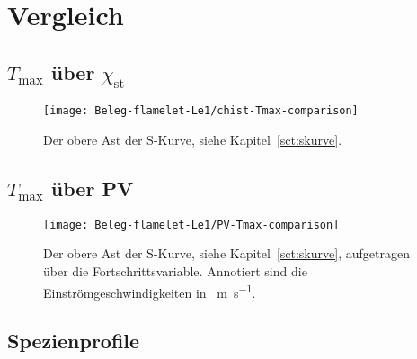 
\section{Vergleich}

\subsection{\texorpdfstring{$T_\mathrm{max}$}{Tmax} über \texorpdfstring{$\chi_\mathrm{st}$}{chist}}
\label{sct:cmp-Tmax-chist}

\begin{figure}[H]
    \begin{center}\begin{minipage}{0.7\linewidth}
        \texttt{[image: Beleg-flamelet-Le1/chist-Tmax-comparison]}
    \end{minipage}\end{center}
    \caption{Der obere Ast der S-Kurve, siehe Kapitel~\ref{sct:skurve}.}
\end{figure}

\subsection{\texorpdfstring{$T_\mathrm{max}$}{Tmax} über PV}
\label{sct:cmp-Tmax-PV}

\begin{figure}[H]
    \begin{center}\begin{minipage}{0.7\linewidth}
        \texttt{[image: Beleg-flamelet-Le1/PV-Tmax-comparison]}
    \end{minipage}\end{center}
    \caption{Der obere Ast der S-Kurve, siehe Kapitel~\ref{sct:skurve}, aufgetragen über die Fortschrittsvariable. Annotiert sind die Einströmgeschwindigkeiten in \SI{}{\meter\per\second}.}
\end{figure}


\subsection{Spezienprofile}

